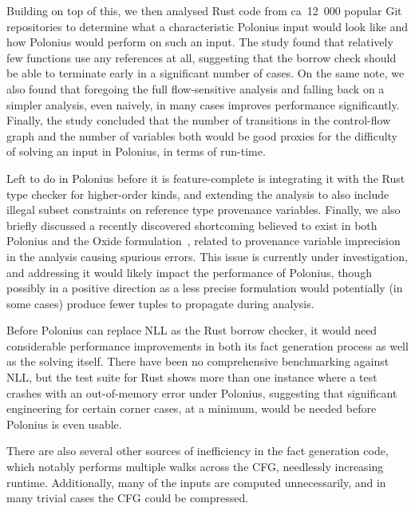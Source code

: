\documentclass[11pt,a4paper,twoside,openany]{report}
\renewcommand\_{\textunderscore\allowbreak}
\begin{document}
Building on top of this, we then analysed Rust code from ca~12~000 popular Git
repositories to determine what a characteristic Polonius input would look like
and how Polonius would perform on such an input. The study found that relatively
few functions use any references at all, suggesting that the borrow check should
be able to terminate early in a significant number of cases. On the same note,
we also found that foregoing the full flow-sensitive analysis and falling back
on a simpler analysis, even naively, in many cases improves performance
significantly. Finally, the study concluded that the number of transitions in
the control-flow graph and the number of variables both would be good proxies
for the difficulty of solving an input in Polonius, in terms of run-time.

Left to do in Polonius before it is feature-complete is integrating it with the
Rust type checker for higher-order kinds, and extending the analysis to also
include illegal subset constraints on reference type provenance variables.
Finally, we also briefly discussed a recently discovered shortcoming believed to
exist in both Polonius and the Oxide formulation~\cite{weiss_oxide:_2019},
related to provenance variable imprecision in the analysis causing spurious
errors. This issue is currently under investigation, and addressing it would
likely impact the performance of Polonius, though possibly in a positive
direction as a less precise formulation would potentially (in some cases)
produce fewer tuples to propagate during analysis.

Before Polonius can replace NLL as the Rust borrow checker, it would need
considerable performance improvements in both its fact generation process as
well as the solving itself. There have been no comprehensive benchmarking
against NLL, but the test suite for Rust shows more than one instance where a
test crashes with an out-of-memory error under Polonius, suggesting that
significant engineering for certain corner cases, at a minimum, would be needed
before Polonius is even usable.

There are also several other sources of inefficiency in the fact generation
code, which notably performs multiple walks across the CFG, needlessly
increasing runtime. Additionally, many of the inputs are computed unnecessarily,
and in many trivial cases the CFG could be compressed.
\end{document}
